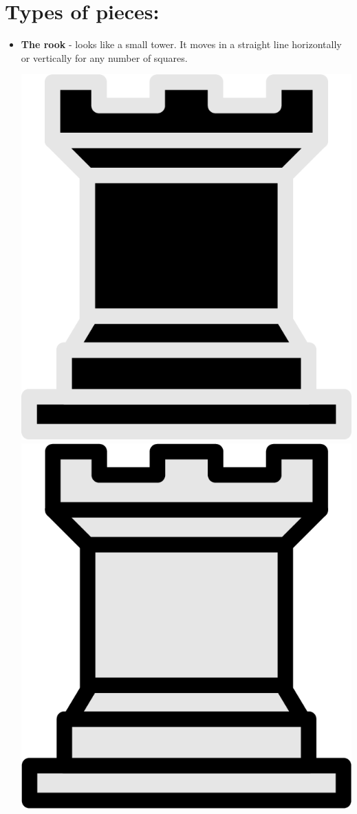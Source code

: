 \documentclass{article}
\begin{document}
\section{Types of pieces:}
\begin{itemize}

    
    \item \textbf{The rook} - looks like a small tower. It moves in a straight line horizontally or vertically for any number of squares. \\
	  \begin{center}
    	\includegraphics[scale=0.1]{image3.png}
    	\includegraphics[scale=0.1]{image7.png}

\end{center}
\end{itemize}
\end{document}

